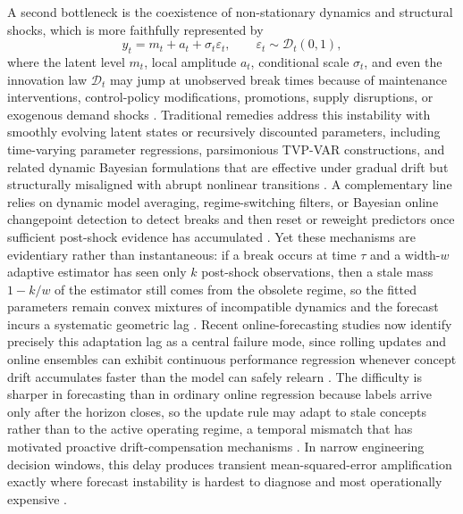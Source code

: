 \documentclass[review,number,sort&compress]{elsarticle}
\begin{document}
A second bottleneck is the coexistence of non-stationary dynamics and structural shocks, which is more faithfully represented by
\[
y_t = m_t + a_t + \sigma_t \varepsilon_t, \qquad \varepsilon_t \sim \mathcal{D}_t(0,1),
\]
where the latent level $m_t$, local amplitude $a_t$, conditional scale $\sigma_t$, and even the innovation law $\mathcal{D}_t$ may jump at unobserved break times because of maintenance interventions, control-policy modifications, promotions, supply disruptions, or exogenous demand shocks \cite{hamilton1990regime,hamilton1994arch}. Traditional remedies address this instability with smoothly evolving latent states or recursively discounted parameters, including time-varying parameter regressions, parsimonious TVP-VAR constructions, and related dynamic Bayesian formulations that are effective under gradual drift but structurally misaligned with abrupt nonlinear transitions \cite{callot2014tvpvar,fischer2021tvpvar}. A complementary line relies on dynamic model averaging, regime-switching filters, or Bayesian online changepoint detection to detect breaks and then reset or reweight predictors once sufficient post-shock evidence has accumulated \cite{onorante2014dma,adams2007bocpd}. Yet these mechanisms are evidentiary rather than instantaneous: if a break occurs at time $\tau$ and a width-$w$ adaptive estimator has seen only $k$ post-shock observations, then a stale mass $1-k/w$ of the estimator still comes from the obsolete regime, so the fitted parameters remain convex mixtures of incompatible dynamics and the forecast incurs a systematic geometric lag \cite{lu2020drift,tosi2023optwin}. Recent online-forecasting studies now identify precisely this adaptation lag as a central failure mode, since rolling updates and online ensembles can exhibit continuous performance regression whenever concept drift accumulates faster than the model can safely relearn \cite{zhang2023onenet,zhang2024d3a}. The difficulty is sharper in forecasting than in ordinary online regression because labels arrive only after the horizon closes, so the update rule may adapt to stale concepts rather than to the active operating regime, a temporal mismatch that has motivated proactive drift-compensation mechanisms \cite{zhao2024proceed}. In narrow engineering decision windows, this delay produces transient mean-squared-error amplification exactly where forecast instability is hardest to diagnose and most operationally expensive \cite{casini2018forecast,wendelberger2021bocpd}.
\end{document}
